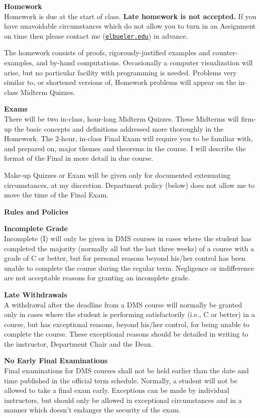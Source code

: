 \documentclass[12pt]{article}
\renewcommand{\emph}[1]{\textsf{\textbf{#1}}}
\newcommand{\localhead}[1]{\par\smallskip\textbf{#1} \smallskip\nobreak\\}%
\def\heading#1{\localhead{\large\emph{#1}}}
\def\subheading#1{\localhead{\emph{#1}}}
\begin{document}
\heading{Homework}
Homework is due at the start of class.  \emph{Late homework is not accepted.}  If you have unavoidable circumstances which do not allow you to turn in an Assignment on time then please contact me (\href{mailto:elbueler@alaska.edu}{\texttt{elbueler\@@alaska.edu}}) in advance.

The homework consists of proofs, rigorously-justified examples and counter-examples, and by-hand computations.  Occasionally a computer visualization will arise, but no particular facility with programming is needed.  Problems very similar to, or shortened versions of, Homework problems will appear on the in-class Midterm Quizzes.


\heading{Exams}
There will be two in-class, hour-long Midterm Quizzes.  These Midterms will firm-up the basic concepts and definitions addressed more thoroughly in the Homework.  The 2-hour, in-class Final Exam will require you to be familiar with, and prepared on, major themes and theorems in the course.  I will describe the format of the Final in more detail in due course.

Make-up Quizzes or Exam will be given only for documented extenuating circumstances, at my discretion.  Department policy (below) does not allow me to move the time of the Final Exam.


\phantom{foo}
\heading{Rules and Policies}
\vskip -20pt

\subheading{Incomplete Grade} 
Incomplete (I) will only be given in
  DMS courses in cases where
  the student has completed the majority (normally all but the last
  three weeks) of a course with a grade of C or better, but for
  personal reasons beyond his/her control has been unable to complete
  the course during the regular term. Negligence or indifference are
  not acceptable reasons for granting an incomplete grade.

\subheading{Late Withdrawals} 
A withdrawal after the deadline from a DMS course will
  normally be granted only in cases where the student is performing
  satisfactorily (i.e., C or better) in a course, but has exceptional
  reasons, beyond his/her control, for being unable to complete the
  course.  These exceptional reasons should be detailed in writing to
  the instructor, Department Chair and the Dean.

\subheading{No Early Final Examinations}
Final examinations for DMS courses shall not be held earlier than the date and time published in the official term schedule.  Normally, a student will not be allowed to take a final exam early.  Exceptions can be made by individual instructors, but should only be allowed in exceptional circumstances and in a manner which doesn't endanger the security of the exam.
\end{document}
